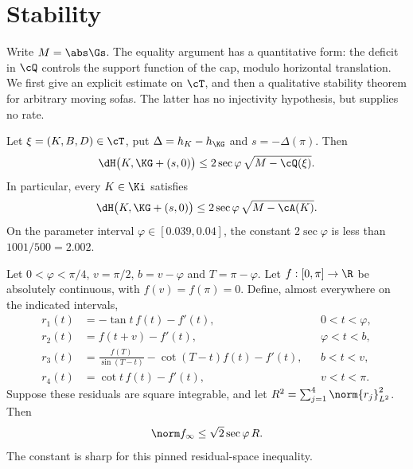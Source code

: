 \section{Stability}\label{sec:stability}

Write $M=\abs\Gs$. The equality argument has a quantitative form: the deficit
in $\cQ$ controls the support function of the cap, modulo horizontal
translation. We first give an explicit estimate on $\cT$, and then a
qualitative stability theorem for arbitrary moving sofas. The latter has no
injectivity hypothesis, but supplies no rate.

\begin{theorem}\label{thm:stability-cap}
Let $\xi=(K,B,D)\in\cT$, put $\Delta=h_K-h_{\KG}$ and $s=-\Delta(\pi)$.
Then
\begin{equation}\label{eq:stability-Q}
  \dH\bigl(K,\KG+(s,0)\bigr)
    \le 2\sec\varphi\,\sqrt{M-\cQ(\xi)}.
\end{equation}
In particular, every $K\in\Ki$ satisfies
\begin{equation}\label{eq:stability-area}
  \dH\bigl(K,\KG+(s,0)\bigr)
    \le 2\sec\varphi\,\sqrt{M-\cA(K)}.
\end{equation}
On the parameter interval $\varphi\in[0.039,0.04]$, the constant
$2\sec\varphi$ is less than $1001/500=2.002$.
\end{theorem}

\begin{lemma}\label{lem:stability-residual}
Let $0<\varphi<\pi/4$, $v=\pi/2$, $b=v-\varphi$ and $T=\pi-\varphi$.
Let $f:[0,\pi]\to\R$ be absolutely continuous, with $f(v)=f(\pi)=0$.
Define, almost everywhere on the indicated intervals,
\begin{align*}
 r_1(t)&=-\tan t\,f(t)-f'(t), &&0<t<\varphi,\\
 r_2(t)&=f(t+v)-f'(t), &&\varphi<t<b,\\
 r_3(t)&=\frac{f(T)}{\sin(T-t)}-\cot(T-t)f(t)-f'(t), &&b<t<v,\\
 r_4(t)&=\cot t\,f(t)-f'(t), &&v<t<\pi.
\end{align*}
Suppose these residuals are square integrable, and let
$R^2=\sum_{j=1}^4\norm{r_j}_{L^2}^2$. Then
\begin{equation}\label{eq:stability-residual}
  \norm f_\infty\le\sqrt2\sec\varphi\,R.
\end{equation}
The constant is sharp for this pinned residual-space inequality.
\end{lemma}


